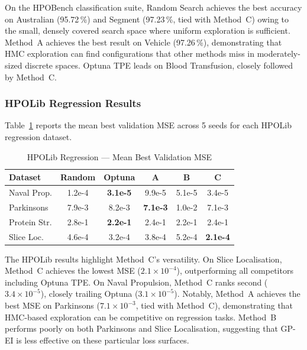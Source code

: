 \documentclass[12pt,a4paper]{article}
\begin{document}
On the HPOBench classification suite, Random Search achieves the best
accuracy on Australian (95.72\,\%) and Segment (97.23\,\%, tied with
Method~C) owing to the small, densely covered search space where
uniform exploration is sufficient.  Method~A achieves the best result
on Vehicle (97.26\,\%), demonstrating that HMC exploration can find
configurations that other methods miss in moderately-sized discrete
spaces.  Optuna TPE leads on Blood Transfusion, closely followed by
Method~C.

\subsubsection{HPOLib Regression Results}

Table~\ref{tab:hpolib_reg} reports the mean best validation MSE
across 5 seeds for each HPOLib regression dataset.

\begin{table}[tb]
\centering
\caption{HPOLib Regression — Mean Best Validation MSE}
\label{tab:hpolib_reg}
\renewcommand{\arraystretch}{1.15}
\begin{tabular}{lccccc}
\toprule
\textbf{Dataset} & \textbf{Random} & \textbf{Optuna} & \textbf{A} & \textbf{B} & \textbf{C} \\
\midrule
Naval Prop.     & 1.2e-4 & \textbf{3.1e-5} & 9.9e-5 & 5.1e-5 & 3.4e-5 \\
Parkinsons      & 7.9e-3 & 8.2e-3 & \textbf{7.1e-3} & 1.0e-2 & 7.1e-3 \\
Protein Str.    & 2.8e-1 & \textbf{2.2e-1} & 2.4e-1 & 2.2e-1 & 2.4e-1 \\
Slice Loc.      & 4.6e-4 & 3.2e-4 & 3.8e-4 & 5.2e-4 & \textbf{2.1e-4} \\
\bottomrule
\end{tabular}
\end{table}

The HPOLib results highlight Method~C's versatility.  On Slice
Localisation, Method~C achieves the lowest MSE ($2.1 \times 10^{-4}$),
outperforming all competitors including Optuna TPE.  On Naval
Propulsion, Method~C ranks second ($3.4 \times 10^{-5}$), closely
trailing Optuna ($3.1 \times 10^{-5}$).  Notably, Method~A achieves the
best MSE on Parkinsons ($7.1 \times 10^{-3}$, tied with Method~C),
demonstrating that HMC-based exploration can be competitive on
regression tasks.  Method~B performs poorly on both Parkinsons and
Slice Localisation, suggesting that GP-EI is less effective on these
particular loss surfaces.
\end{document}

